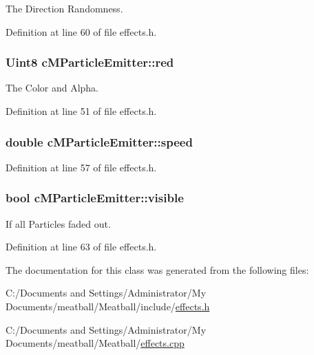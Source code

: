 The Direction Randomness. 



Definition at line 60 of file effects.\-h.

\hypertarget{classc_m_particle_emitter_a8ef694bdcf4547deaba04299d20b7957}{
\subsubsection[{red}]{\setlength{\rightskip}{0pt plus 5cm}Uint8 c\-M\-Particle\-Emitter\-::red}}\label{classc_m_particle_emitter_a8ef694bdcf4547deaba04299d20b7957}


The Color and Alpha. 



Definition at line 51 of file effects.\-h.

\hypertarget{classc_m_particle_emitter_acfe8c4c88b2699b3717772c2809e4960}{
\subsubsection[{speed}]{\setlength{\rightskip}{0pt plus 5cm}double c\-M\-Particle\-Emitter\-::speed}}\label{classc_m_particle_emitter_acfe8c4c88b2699b3717772c2809e4960}


Definition at line 57 of file effects.\-h.

\hypertarget{classc_m_particle_emitter_a0fd2c32626022c434dc27000fb507526}{
\subsubsection[{visible}]{\setlength{\rightskip}{0pt plus 5cm}bool c\-M\-Particle\-Emitter\-::visible}}\label{classc_m_particle_emitter_a0fd2c32626022c434dc27000fb507526}


If all Particles faded out. 



Definition at line 63 of file effects.\-h.



The documentation for this class was generated from the following files\-:\begin{DoxyCompactItemize}
\item 
C\-:/\-Documents and Settings/\-Administrator/\-My Documents/meatball/\-Meatball/include/\hyperlink{effects_8h}{effects.\-h}\item 
C\-:/\-Documents and Settings/\-Administrator/\-My Documents/meatball/\-Meatball/\hyperlink{effects_8cpp}{effects.\-cpp}\end{DoxyCompactItemize}
